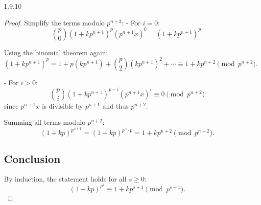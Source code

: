 \documentclass[12pt]{amsart}
\theoremstyle{definition}
\numberwithin{equation}{section}
\begin{document}
\begin{exercise}{1.9.10}
\begin{proof}
Simplify the terms modulo \(p^{n+2}\):
- For \(i = 0\):
\[
\binom{p}{0} (1 + kp^{n+1})^p (p^{n+1}x)^0 = (1 + kp^{n+1})^p.
\]

Using the binomial theorem again:
\[
(1 + kp^{n+1})^p = 1 + p(kp^{n+1}) + \binom{p}{2}(kp^{n+1})^2 + \cdots \equiv 1 + kp^{n+2} \pmod{p^{n+2}}.
\]

- For \(i > 0\):
\[
\binom{p}{i} (1 + kp^{n+1})^{p-i} (p^{n+1}x)^i \equiv 0 \pmod{p^{n+2}}
\]
since \(p^{n+1}x\) is divisible by \(p^{n+1}\) and thus \(p^{n+2}\).

Summing all terms modulo \(p^{n+2}\):
\[
(1 + kp)^{p^{n+1}} = (1 + kp)^{p^n \cdot p} = 1 + kp^{n+2} \pmod{p^{n+2}}.
\]

\subsection*{Conclusion}
By induction, the statement holds for all \(s \geq 0\):
\[
(1 + kp)^{p^s} \equiv 1 + kp^{s+1} \pmod{p^{s+1}}.
\]

\end{proof}

\end{exercise}
\newpage
\end{document}
